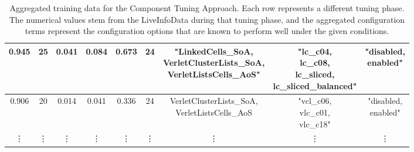 \begin{table}[H]
\begin{tabular}{|c|c|c|c|c|c|c|c|c|}
        \hline
        0.945                                            & 25                                          & 0.041                                                        & 0.084                                 & 0.673  & 24     & \tabularCenterstack{c}{"LinkedCells\_SoA,                         \\ VerletClusterLists\_SoA, \\ VerletListsCells\_AoS"} & \tabularCenterstack{c}{"lc\_c04, \\ lc\_c08, \\ lc\_sliced, \\ lc\_sliced\_balanced"} & \tabularCenterstack{c}{"disabled, \\ enabled"}  \\
        \hline
        0.906                                            & 20                                          & 0.014                                                        & 0.041                                 & 0.336  & 24     & \tabularCenterstack{c}{VerletClusterLists\_SoA,                   \\ VerletListsCells\_AoS} & \tabularCenterstack{c}{"vcl\_c06, \\ vlc\_c01, \\ vlc\_c18"} & \tabularCenterstack{c}{"disabled, \\ enabled"} \\
        \hline
        \vdots                                           & \vdots                                      & \vdots                                                       & \vdots                                & \vdots & \vdots & \vdots                                          & \vdots & \vdots \\
        \hline
    \end{tabular}
    \caption[Aggregated training data for the Component Tuning Approach]{Aggregated training data for the Component Tuning Approach. Each row represents a different tuning phase. The numerical values stem from the LiveInfoData during that tuning phase, and the aggregated configuration terms represent the configuration options that are known to perform well under the given conditions.}
    \label{tab:trainingDataComponent}
\end{table}



